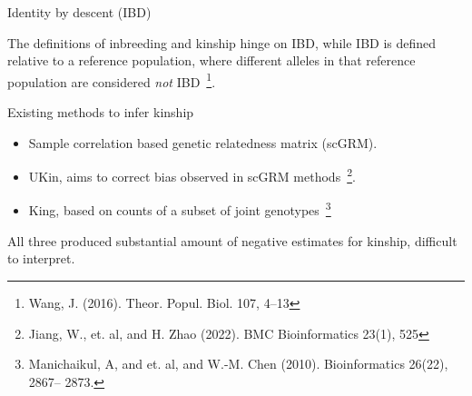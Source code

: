 \documentclass[]{beamer}
\begin{document}
\begin{frame}{Identity by descent (IBD)}

The definitions of inbreeding and kinship hinge on IBD, while IBD is defined relative to a reference population, where different alleles in that reference population are considered \emph{not} IBD~\footnote{Wang, J. (2016). Theor. Popul. Biol. 107, 4–13}. 

\end{frame}

\begin{frame}{Existing methods to infer kinship}
 \begin{itemize}
 \item  Sample correlation based genetic relatedness matrix (scGRM).     
 \item  UKin, aims to correct bias observed in scGRM methods~\footnote{Jiang, W., et. al, and H. Zhao (2022). BMC Bioinformatics 23(1), 525}. 
 \item  King, based on counts of a subset of joint genotypes~\footnote{Manichaikul, A, and et. al, and W.-M. Chen (2010). Bioinformatics 26(22), 2867– 2873.}
 \end{itemize}
 All three produced substantial amount of negative estimates for kinship, difficult to interpret. 
\end{frame}
\end{document}
